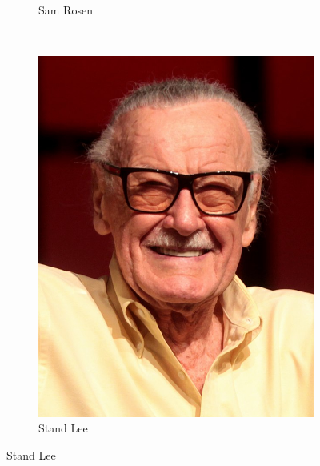 \begin{frame}{}
\begin{figure}[htp]
\begin{subfigure}[b]{0.16\textwidth}
   \caption{Sam Rosen}
 \end{subfigure}
~
 \begin{subfigure}[b]{0.16\textwidth}
   \includegraphics[width=\textwidth]{img/artistas/StanLee}
   \caption{Stand Lee}
 \end{subfigure}
\end{figure}
\end{frame}


